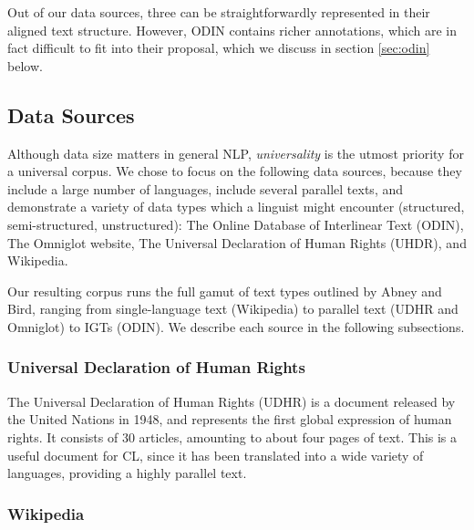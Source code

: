 Out of our data sources, three can be straightforwardly represented in their aligned text structure.  However, ODIN contains richer annotations, which are in fact difficult to fit into their proposal, which we discuss in section \ref{sec:odin} below.


\subsection{Data Sources} \label{sec:sources}

Although data size matters in general NLP, \emph{universality} is the utmost priority for a universal corpus. We chose to focus on the following data sources, because they include a large number of languages, include several parallel texts, and demonstrate a variety of data types which a linguist might encounter (structured, semi-structured, unstructured): The Online Database of Interlinear Text (ODIN), The Omniglot website, The Universal Declaration of Human Rights (UHDR), and Wikipedia.



Our resulting corpus runs the full gamut of text types outlined by Abney and Bird, ranging from single-language text (Wikipedia) to parallel text (UDHR and Omniglot) to IGTs (ODIN).  We describe each source in the following subsections.


\subsubsection{Universal Declaration of Human Rights}

The Universal Declaration of Human Rights (UDHR) is a document released by the United Nations in 1948, and represents the first global expression of human rights. It consists of 30 articles, amounting to about four pages of text. This is a useful document for CL, since it has been translated into a wide variety of languages, providing a highly parallel text.


\subsubsection{Wikipedia}

